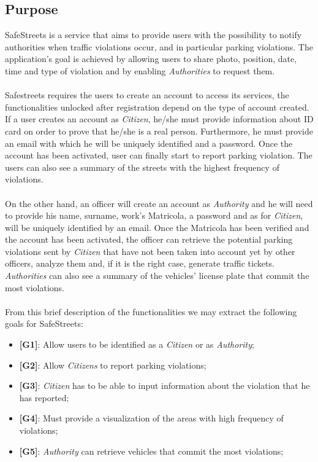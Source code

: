 \documentclass{article}
\begin{document}
\subsection{Purpose}
SafeStreets is a service that aims to provide users with the possibility to notify authorities when traffic 
violations occur, and in particular parking violations. The application's goal is achieved by allowing users 
to share photo, position, date, time and type of violation and by enabling \textit{Authorities} to request them.
\\
\\
Safestreets requires the users to create an account to access its services, the functionalities unlocked after 
registration depend on the type of account created.
\\
If a user creates an account as \textit{Citizen}, he/she must provide information about ID card on order to prove 
that he/she is a real person. Furthermore, he must provide an email with which he will be uniquely identified 
and a password. Once the account has been activated, user can finally start to report parking violation. 
The users can also see a summary of the streets with the highest frequency of violations.
\\
\\
On the other hand, an officer will create an account as \textit{Authority} and he will need to provide his name, surname, 
work's Matricola, a password and as for \textit{Citizen}, will be uniquely identified by an email. Once the Matricola 
has been verified and the account has been activated, the officer can retrieve the potential parking violations 
sent by \textit{Citizen} that have not been taken into account yet by other officers, analyze them and, if it is the 
right case, generate traffic tickets. \textit{Authorities} can also see a summary of the vehicles' license plate that 
commit the most violations.
\\
\\
From this brief description of the functionalities we may extract the following goals for SafeStreets:
\begin{itemize}
    \item \textbf{[G1]}: Allow users to be identified as a \textit{Citizen} or as \textit{Authority};
    \item \textbf{[G2]}: Allow \textit{Citizens} to report parking violations;
    \item \textbf{[G3]}: \textit{Citizen} has to be able to input information about the violation that he has reported;
    \item \textbf{[G4]}: Must provide a visualization of the areas with high frequency of violations;
    \item \textbf{[G5]}: \textit{Authority} can retrieve vehicles that commit the most violations; 

\end{itemize}
\end{document}

